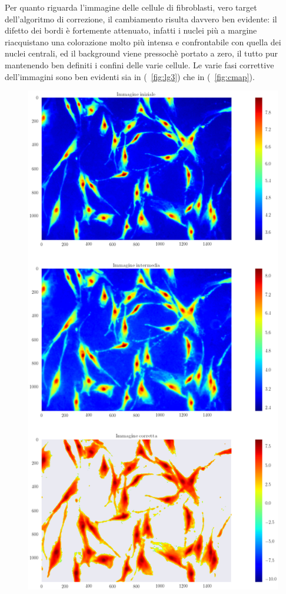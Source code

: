 Per quanto riguarda l'immagine delle cellule di fibroblasti, vero target dell'algoritmo di correzione, il cambiamento risulta davvero ben evidente: il difetto dei bordi è fortemente attenuato, infatti i nuclei più a margine riacquistano una colorazione molto più intensa e confrontabile con quella dei nuclei centrali, ed il background viene pressochè portato a zero, il tutto pur mantenendo ben definiti i confini delle varie cellule.
Le varie fasi correttive dell'immagini sono ben evidenti sia in (\figurename~\ref{fig:lg3}) che in (\figurename~\ref{fig:cmap}).

\begin{figure}
 \centering
 \includegraphics[scale=.50]{img/CAP4lg3.png}

\end{figure}
